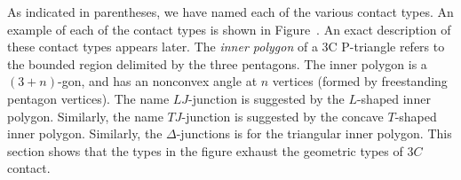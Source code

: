 As indicated in parentheses, we have named each of the various contact
types.  An example of each of the contact types is shown in
Figure~.  An exact description of these contact types
appears later.  The \emph{inner polygon} of a 3C P-triangle refers to
the bounded region delimited by the three pentagons.  The inner
polygon is a $(3+n)$-gon, and has an nonconvex angle at $n$ vertices
(formed by freestanding pentagon vertices). The name $LJ$-junction is
suggested by the $L$-shaped inner polygon.  Similarly, the name
$TJ$-junction is suggested by the concave $T$-shaped inner polygon.
Similarly, the $\Delta$-junctions is for the triangular inner polygon.
This section shows that the types in the figure exhaust the geometric
types of $3C$ contact.


%
